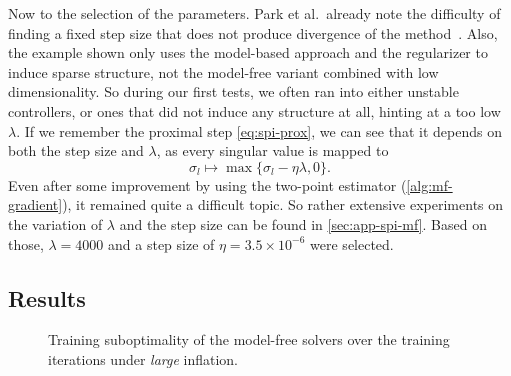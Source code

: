 Now to the selection of the parameters. Park et al.\ already note the difficulty of finding a fixed step size
that does not produce divergence of the method~\cite{Park2020Structured}. Also, the example shown only
uses the model-based approach and the regularizer to induce sparse structure, not the model-free variant combined
with low dimensionality. So during our first tests, we often ran into either unstable controllers, or ones that
did not induce any structure at all, hinting at a too low $\lambda$. If we remember the proximal step
\eqref{eq:spi-prox}, we can see that it depends on both the step size and $\lambda$, as every singular value is
mapped to
\begin{equation}
    \label{eq:spi-threshold}
    \sigma_l \mapsto \max\{ \sigma_l - \eta \lambda, 0 \} .
\end{equation}
Even after some improvement by using the two-point estimator (\cref{alg:mf-gradient}), it remained quite a difficult
topic. So rather extensive experiments on the variation of $\lambda$ and the step size can be found in \cref{sec:app-spi-mf}.
Based on those, $\lambda = 4000$ and a step size of $\eta = 3.5 \times 10^{-6}$ were selected.

\subsection{Results}
\label{subsec:unknown-model-results}

\begin{figure}[htbp]
  \centering
  \caption{Training suboptimality of the model-free solvers over the training iterations
    under \emph{large} inflation.}
  \label{fig:ch4-identified-large-curves-iterations}
\end{figure}




